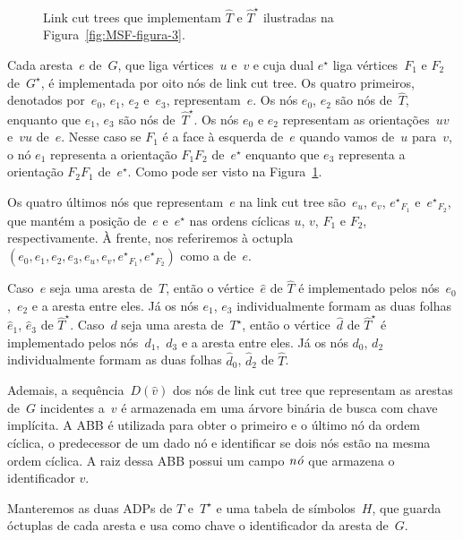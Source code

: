\begin{figure}[htb]
\scalebox{1.5}{
\centering

}
\caption{Link cut trees que implementam $\hat T$ e $\hat T^\star$ ilustradas na Figura~\ref{fig:MSF-figura-3}.}
\label{fig:MSF-figura-4}
\end{figure}

Cada aresta~$e$ de~$G$, que liga vértices~$u$ e~$v$ e cuja dual $e^\star$ liga vértices~$F_1$ e $F_2$ de~$G^\star$, é implementada por oito nós de link cut tree.
Os quatro primeiros, denotados por~$e_0$, $e_1$, $e_2$ e~$e_3$, representam~$e$.
Os nós $e_0$, $e_2$ são nós de~$\hat T$, enquanto que $e_1$, $e_3$ são nós de~$\hat T^\star$.
Os nós $e_0$ e $e_2$ representam as orientações~$uv$ e~$vu$ de~$e$.
Nesse caso se $F_1$ é a face à esquerda de~$e$ quando vamos de~$u$ para~$v$, o nó $e_1$ representa a orientação $F_1F_2$ de~$e^\star$ enquanto que $e_3$ representa a orientação $F_2F_1$ de~$e^\star$.
Como pode ser visto na Figura~\ref{fig:MSF-figura-4}.

Os quatro últimos nós que representam~$e$ na link cut tree são~$e_u$, $e_v$, ${e^\star}_{F_1}$ e~${e^\star}_{F_2}$, que mantém a posição de~$e$ e~$e^\star$ nas ordens cíclicas $u$, $v$, $F_1$ e $F_2$, respectivamente.
À frente, nos referiremos à octupla $( e_0, e_1, e_2, e_3, e_u, e_v, {e^\star}_{F_1}, {e^\star}_{F_2})$ como a  de~$e$.

Caso~$e$ seja uma aresta de~$T$, então o vértice~$\hat e$ de $\hat T$ é implementado pelos nós~$e_0$,~$e_2$ e a aresta entre eles.
Já os nós $e_1$, $e_3$ individualmente formam as duas folhas $\hat e_1$, $\hat e_3$ de $\hat T^\star$.
Caso~$d$ seja uma aresta de~$T^\star$, então o vértice~$\hat d$ de $\hat T^\star$ é implementado pelos nós~$d_1$,~$d_3$ e a aresta entre eles.
Já os nós $d_0$, $d_2$ individualmente formam as duas folhas $\hat d_0$, $\hat d_2$ de $\hat T$.

Ademais, a sequência~$D(\hat v)$ dos nós de link cut tree que representam as arestas de~$G$ incidentes a~$v$ é armazenada em uma árvore binária de busca com chave implícita.
A ABB é utilizada para obter o primeiro e o último nó da ordem cíclica, o predecessor de um dado nó e identificar se dois nós estão na mesma ordem cíclica.
A raiz dessa ABB possui um campo $\mathit{n\acute{o}}$ que armazena o identificador $v$.

Manteremos as duas ADPs de $T$ e~$T^\star$ e uma tabela de símbolos~$H$, que guarda óctuplas de cada aresta e usa como chave o identificador da aresta de~$G$.

